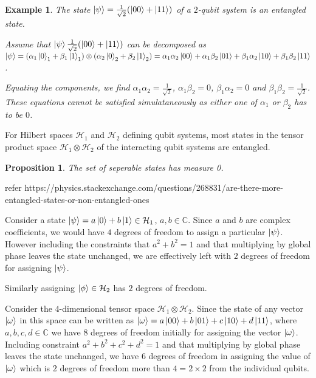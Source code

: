 \documentclass[12pt,twoside,fleqn]{report}
\makeatletter
\theoremstyle{thmstyle}
\renewenvironment{proof}[1][\proofname]{\par
\pushQED{\qed}%
\normalfont \topsep6\p@\@plus6\p@\relax
\trivlist
\item[\hskip\labelsep\itshape#1\@addpunct{.}]\mbox{}\par\nobreak\ignorespaces
}{%
    \popQED\endtrivlist\@endpefalse
    }
\newtheorem{eg}{Example}[chapter]
\newtheorem{prop}{Proposition}[chapter]
\makeatother
\begin{document}
\begin{eg}
The state $\ket{\psi} = \frac{1}{\sqrt{2}} (\ket{00} + \ket{11})$ of a $2$-qubit system is an entangled state.

    Assume that  $\ket{\psi} \frac{1}{\sqrt{2}} (\ket{00} + \ket{11}) $ can be decomposed as $\ket{\psi} = (\alpha_1 \ket{0}_1 + \beta_1 \ket{1}_1) \otimes (\alpha_2 \ket{0}_2 + \beta_2 \ket{1}_2) = \alpha_1 \alpha_2 \ket{00} + \alpha_1 \beta_2 \ket{01} + \beta_1 \alpha_2 \ket{10} + \beta_1 \beta_2 \ket{11}$.

    Equating the components, we find $\alpha_1 \alpha_2 = \displaystyle\frac{1}{\sqrt{2}}$, $\alpha_1 \beta_2 = 0$, $\beta_1 \alpha_2 = 0$ and $\beta_1 \beta_2 = \displaystyle\frac{1}{\sqrt{2}}$. These equations cannot be satisfied simulataneously as either one of $\alpha_1$ or $\beta_2$ has to be $0$.
\end{eg}


For Hilbert spaces $\mathcal{H}_1$ and $\mathcal{H}_2$ defining qubit systems, most states in the tensor product space $\mathcal{H}_1 \otimes \mathcal{H}_2$ of the interacting qubit systems are entangled.
\begin{prop}
    The set of seperable states has measure 0.
\end{prop}

\begin{proof}[intuition]
    refer https://physics.stackexchange.com/questions/268831/are-there-more-entangled-states-or-non-entangled-ones 

    Consider a state $\ket{\psi} = a \ket{0} + b \ket{1} \in \mathcal{H}_1$, $a,b \in \mathbb{C}$. Since $a$ and $b$ are complex coefficients, we would have $4$ degrees of freedom to assign a particular $\ket{\psi}$. However including the constraints that $a^2 + b^2 = 1$ and that multiplying by global phase leaves the state unchanged, we are effectively left with $2$ degrees of freedom for assigning $\ket{\psi}$. 
    
Similarly assigning $\ket{\phi} \in \mathcal{H}_2$ has $2$ degrees of freedom.

    Consider the $4$-dimensional tensor space $\mathcal{H}_1 \otimes \mathcal{H}_2$. Since the state of any vector $\ket{\omega}$ in this space can be written as $\ket{\omega} = a \ket{00} + b \ket{01} + c \ket{10} + d \ket{11}$, where $a, b, c, d \in \mathbb{C}$ we have $8$ degrees of freedom initially for assigning the vector $\ket{\omega}$. Including constraint $a^2 + b^2 + c^2 + d^2 = 1$ and that multiplying by global phase leaves the state unchanged, we have $6$ degrees of freedom in assigning the value of $\ket{\omega}$ which is $2$ degrees of freedom more than $4 = 2 \times 2$ from the individual qubits.
\end{proof}
\end{document}
